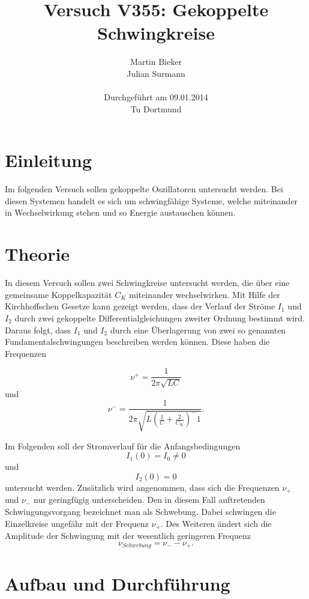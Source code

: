 \documentclass[11pt,ngerman,a4paper]{article}
\title{\textbf{Versuch V355: Gekoppelte Schwingkreise}}
\author{Martin Bieker\\
		Julian Surmann\\
		\\
		Durchgef\"{u}hrt am 09.01.2014\\
		Tu Dortmund}
\date{}
\begin{document}
\renewcommand\tablename{Tabelle}
\renewcommand\figurename{Abbildung}
\maketitle
\thispagestyle{empty}
\newpage
\clearpage
\setcounter{page}{1}


\section{Einleitung}
Im folgenden Versuch sollen gekoppelte Oszillatoren untersucht werden. Bei diesen Systemen handelt es sich um schwingfähige Systeme, welche miteinander in Wechselwirkung stehen und so Energie austauschen können. 

\section{Theorie}

In diesem Versuch sollen zwei Schwingkreise untersucht werden, die über eine gemeinsame Koppelkapazität $C_K$ miteinander wechselwirken. Mit Hilfe der Kirchhoffschen Gesetze kann gezeigt werden, dass der Verlauf der Ströme $I_1$ und $I_2$ durch zwei gekoppelte Differentialgleichungen zweiter Ordnung bestimmt wird. Daraus folgt, dass $I_1$ und $I_2$ durch eine Überlagerung von zwei so genannten Fundamentalschwingungen beschreiben werden können. Diese haben die Frequenzen


\begin{equation}
\nu^+ = \frac{1}{2 \pi \sqrt{LC}}
\label{nueplus}
\end{equation}
und 
\begin{equation}
\nu^- =\frac1{2\pi\sqrt{L(\frac1C + \frac2{C_K})^-1}}.
\label{nueminus}
\end{equation}

\noindent
Im Folgenden soll der Stromverlauf für die Anfangsbedingungen
\[
I_1(0) = I_0 \neq 0
\] 
und 
\[
I_2(0) = 0
\]
untersucht werden. Zusätzlich wird angenommen, dass sich die Frequenzen $\nu_+$  und $\nu_-$ nur geringfügig unterscheiden. Den in diesem Fall auftretenden Schwingungsvorgang bezeichnet man als Schwebung. Dabei schwingen die Einzelkreise ungefähr mit der Frequenz $\nu_+$. Des Weiteren ändert sich die Amplitude der Schwingung mit der wesentlich geringeren Frequenz 
\begin{equation}
\nu_{Schwebung} = \nu_- - \nu_+.
\end{equation}

\section{Aufbau und Durchf\"{u}hrung}
\end{document}
